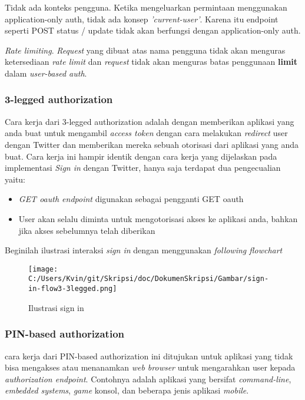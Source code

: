 Tidak ada konteks pengguna. Ketika mengeluarkan permintaan menggunakan application-only auth, tidak ada konsep \textit{'current-user'}. Karena itu endpoint seperti POST status / update tidak akan berfungsi dengan application-only auth.

\textit{Rate limiting}. \textit{Request} yang dibuat atas nama pengguna tidak akan menguras ketersediaan \textit{rate limit} dan \textit{request} tidak akan menguras batas penggunaan \textbf{limit} dalam \textit{user-based auth}.


\subsubsection{3-legged authorization}
Cara kerja dari 3-legged authorization adalah dengan memberikan aplikasi yang anda buat untuk mengambil \textit{access token} dengan cara melakukan \textit{redirect} user dengan Twitter dan memberikan mereka sebuah otorisasi dari aplikasi yang anda buat. Cara kerja ini hampir identik dengan cara kerja yang dijelaskan pada implementasi \textit{Sign in} dengan Twitter, hanya saja terdapat dua pengecualian yaitu:

\begin{itemize}
	\item \textit{GET oauth endpoint} digunakan sebagai pengganti GET oauth
	\item User akan selalu diminta untuk mengotorisasi akses ke aplikasi anda, bahkan jika akses sebelumnya telah diberikan
\end{itemize}

Beginilah ilustrasi interaksi \textit{sign in} dengan menggunakan \textit{following flowchart}

\begin{figure}[hp]
	\centering
		\texttt{[image: C:/Users/Kvin/git/Skripsi/doc/DokumenSkripsi/Gambar/sign-in-flow3-3legged.png]}
	\caption{Ilustrasi sign in}
	\label{fig:sign-in-flow3-3legged}
\end{figure}

\subsubsection{PIN-based authorization}
cara kerja dari PIN-based authorization ini ditujukan untuk aplikasi yang tidak bisa mengakses atau menanamkan \textit{web browser} untuk mengarahkan user kepada \textit{authorization endpoint}. Contohnya adalah aplikasi yang bersifat \textit{command-line}, \textit{embedded systems}, \textit{game} konsol, dan beberapa jenis aplikasi \textit{mobile}.


